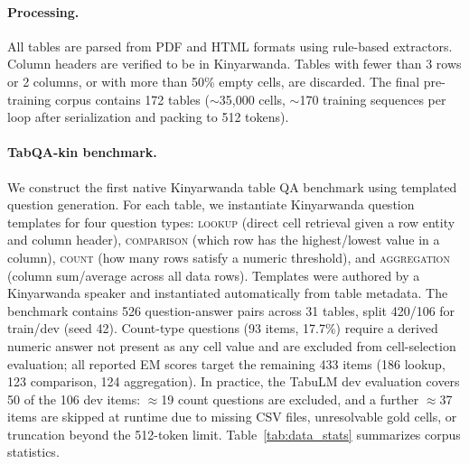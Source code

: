 \documentclass[11pt]{article}
\begin{document}
\paragraph{Processing.}
All tables are parsed from PDF and HTML formats using rule-based extractors.
Column headers are verified to be in Kinyarwanda.
Tables with fewer than 3 rows or 2 columns, or with more than 50\% empty cells, are discarded.
The final pre-training corpus contains 172 tables ($\sim$35,000 cells, $\sim$170 training sequences per loop after serialization and packing to 512 tokens).

\paragraph{TabQA-kin benchmark.}
We construct the first native Kinyarwanda table QA benchmark using templated question generation.
For each table, we instantiate Kinyarwanda question templates for four question types: \textsc{lookup} (direct cell retrieval given a row entity and column header), \textsc{comparison} (which row has the highest/lowest value in a column), \textsc{count} (how many rows satisfy a numeric threshold), and \textsc{aggregation} (column sum/average across all data rows).
Templates were authored by a Kinyarwanda speaker and instantiated automatically from table metadata.
The benchmark contains 526 question-answer pairs across 31 tables, split 420/106 for train/dev (seed 42).
Count-type questions (93 items, 17.7\%) require a derived numeric answer not present as any cell value and are excluded from cell-selection evaluation; all reported EM scores target the remaining 433 items (186 lookup, 123 comparison, 124 aggregation).
In practice, the TabuLM dev evaluation covers 50 of the 106 dev items: $\approx$19 count questions are excluded, and a further $\approx$37 items are skipped at runtime due to missing CSV files, unresolvable gold cells, or truncation beyond the 512-token limit.
Table~\ref{tab:data_stats} summarizes corpus statistics.
\end{document}
